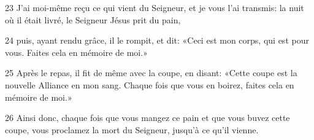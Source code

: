 
23 J’ai moi-même reçu ce qui vient du Seigneur, et je vous l’ai transmis: la nuit où il était livré, le Seigneur Jésus prit du pain,

24 puis, ayant rendu grâce, il le rompit, et dit: «Ceci est mon corps, qui est pour vous. Faites cela en mémoire de moi.»

25 Après le repas, il fit de même avec la coupe, en disant: «Cette coupe est la nouvelle Alliance en mon sang. Chaque fois que vous en boirez, faites cela en mémoire de moi.»

26 Ainsi donc, chaque fois que vous mangez ce pain et que vous buvez cette coupe, vous proclamez la mort du Seigneur, jusqu’à ce qu’il vienne.
